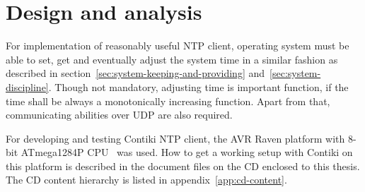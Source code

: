 
\chapter{Design and analysis}
For implementation of reasonably useful NTP client,
operating system must be able to set, get
and eventually adjust the system time in a similar fashion as
described in section~\ref{sec:system-keeping-and-providing} and~\ref{sec:system-discipline}.
Though not mandatory, adjusting time is important function,
if the time shall be always a monotonically increasing function.
Apart from that, communicating abilities over UDP are also required.

For developing and testing Contiki NTP client,
the AVR Raven platform with 8-bit ATmega1284P CPU~\cite{avr-datasheet} was used.
How to get a working setup with Contiki on this platform is described in
the document files on the CD enclosed to this thesis.
The CD content hierarchy is listed in appendix~\ref{app:cd-content}.


%

%


